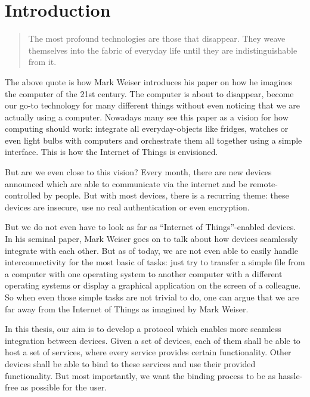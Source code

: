 \chapter{Introduction}

\begin{quote}
    The most profound technologies are those that disappear.
    They weave themselves into the fabric of everyday life until they are indistinguishable from it. \cite{weiser1991computer}
\end{quote}

The above quote is how Mark Weiser introduces his paper on how he imagines the computer of the 21st century.
The computer is about to disappear, become our go-to technology for many different things without even noticing that we are actually using a computer.
Nowadays many see this paper as a vision for how computing should work: integrate all everyday-objects like fridges, watches or even light bulbs with computers and orchestrate them all together using a simple interface.
This is how the Internet of Things is envisioned.

But are we even close to this vision?
Every month, there are new devices announced which are able to communicate via the internet and be remote-controlled by people.
But with most devices, there is a recurring theme: these devices are insecure, use no real authentication or even encryption.

But we do not even have to look as far as ``Internet of Things''-enabled devices.
In his seminal paper, Mark Weiser goes on to talk about how devices seamlessly integrate with each other.
But as of today, we are not even able to easily handle interconnectivity for the most basic of tasks: just try to transfer a simple file from a computer with one operating system to another computer with a different operating systems or display a graphical application on the screen of a colleague.
So when even those simple tasks are not trivial to do, one can argue that we are far away from the Internet of Things as imagined by Mark Weiser.

In this thesis, our aim is to develop a protocol which enables more seamless integration between devices.
Given a set of devices, each of them shall be able to host a set of services, where every service provides certain functionality.
Other devices shall be able to bind to these services and use their provided functionality.
But most importantly, we want the binding process to be as hassle-free as possible for the user.

